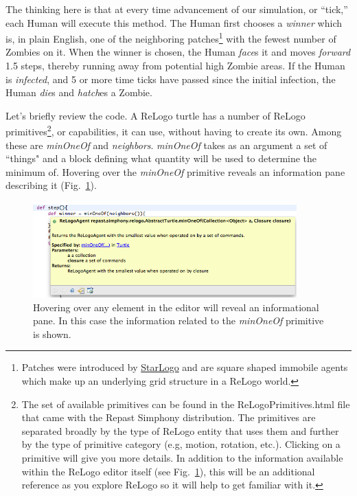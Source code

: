 \documentclass[11pt]{amsart}
\begin{document}
The thinking here is that at every time advancement of our simulation, or ``tick,'' each Human will execute this method. The Human first chooses a \emph{winner} which is, in plain English, one of the neighboring patches\footnote{Patches were introduced by \href{http://education.mit.edu/starlogo/}{StarLogo} and are square shaped immobile agents which make up an underlying grid structure in a ReLogo world.} with the fewest number of Zombies on it. When the winner is chosen, the Human \emph{face}s it and moves \emph{forward} 1.5 steps, thereby running away from potential high Zombie areas. If the Human is \emph{infected}, and 5 or more time ticks have passed since the initial infection, the Human \emph{die}s and \emph{hatch}es a Zombie.

Let's briefly review the code. A ReLogo turtle has a number of ReLogo primitives\footnote{The set of available primitives can be found in the ReLogoPrimitives.html file that came with the Repast Simphony distribution. The primitives are separated broadly by the type of ReLogo entity that uses them and further by the type of primitive category (e.g, motion, rotation, etc.). Clicking on a primitive will give you more details. In addition to the information available within the ReLogo editor itself (see Fig.~\ref{fig:minOneOfInfo}), this will be an additional reference as you explore ReLogo so it will help to get familiar with it.}, or capabilities, it can use, without having to create its own. Among these are \emph{minOneOf} and \emph{neighbors}. \emph{minOneOf} takes as an argument a set of ``things" and a block defining what quantity will be used to determine the minimum of. Hovering over the \emph{minOneOf} primitive reveals an information pane describing it (Fig.~\ref{fig:minOneOfInfo}).

\begin{figure}
\begin{center}
\vspace{.2in}
\centerline {
\includegraphics[width=4in]{GettingStartedImages/MinOneOfInfo.png}
}
\caption{Hovering over any element in the editor will reveal an informational pane. In this case the information related to the \emph{minOneOf} primitive is shown.}
\label{fig:minOneOfInfo}
\end{center}
\end{figure}
\end{document}
